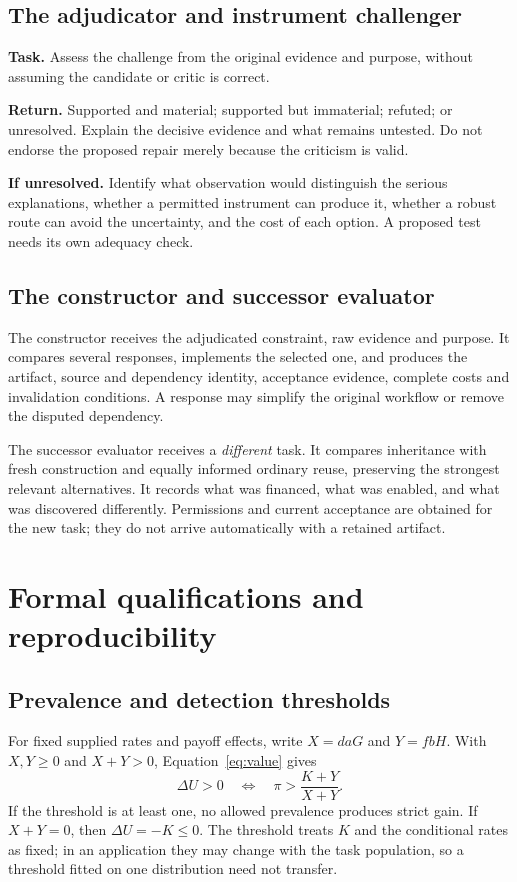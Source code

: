 \subsection{The adjudicator and instrument challenger}
\begin{statusbox}
\textbf{Task.} Assess the challenge from the original evidence and purpose, without assuming the candidate or critic is correct.\par
\textbf{Return.} Supported and material; supported but immaterial; refuted; or unresolved. Explain the decisive evidence and what remains untested. Do not endorse the proposed repair merely because the criticism is valid.\par
\textbf{If unresolved.} Identify what observation would distinguish the serious explanations, whether a permitted instrument can produce it, whether a robust route can avoid the uncertainty, and the cost of each option. A proposed test needs its own adequacy check.
\end{statusbox}

\subsection{The constructor and successor evaluator}
The constructor receives the adjudicated constraint, raw evidence and purpose. It compares several responses, implements the selected one, and produces the artifact, source and dependency identity, acceptance evidence, complete costs and invalidation conditions. A response may simplify the original workflow or remove the disputed dependency.

The successor evaluator receives a \emph{different} task. It compares inheritance with fresh construction and equally informed ordinary reuse, preserving the strongest relevant alternatives. It records what was financed, what was enabled, and what was discovered differently. Permissions and current acceptance are obtained for the new task; they do not arrive automatically with a retained artifact.

\section{Formal qualifications and reproducibility}
\label{app:formal}
\subsection{Prevalence and detection thresholds}
For fixed supplied rates and payoff effects, write $X=daG$ and $Y=fbH$. With $X,Y\geq0$ and $X+Y>0$, Equation~\eqref{eq:value} gives
\begin{equation}
\Delta U>0\quad\Longleftrightarrow\quad \pi>\frac{K+Y}{X+Y}.
\end{equation}
If the threshold is at least one, no allowed prevalence produces strict gain. If $X+Y=0$, then $\Delta U=-K\leq0$. The threshold treats $K$ and the conditional rates as fixed; in an application they may change with the task population, so a threshold fitted on one distribution need not transfer.

